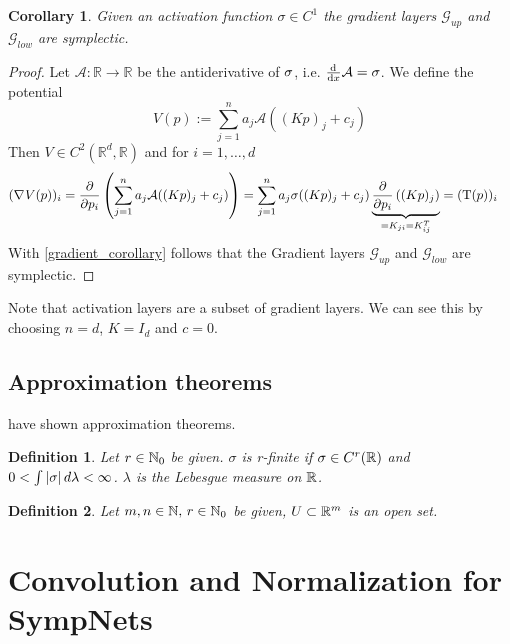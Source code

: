 \documentclass[twoside,a4paper]{article}
\newtheorem{definition}{Definition}
\newtheorem{corollary}{Corollary}
\begin{document}
\begin{corollary}
	Given an activation function $\sigma \in C^1$ the gradient layers $\mathcal{G}_{up}$
	and $\mathcal{G}_{low}$ are symplectic.
\end{corollary}
\begin{proof}
	Let $\mathcal{A}: \mathbb{R} \to \mathbb{R}$ be the antiderivative of $\sigma$, 
	i.e. $\frac{\mathrm{d}^{}}{\mathrm{d}x} \mathcal{A} = \sigma$. We define the potential
	\begin{equation*}
		V(p) := \sum_{j=1}^n a_j \mathcal{A}((Kp)_j + c_j)
	\end{equation*}
	Then $V \in C^2(\mathbb{R}^d, \mathbb{R})$ and for $i=1, \dots, d$
	\begin{align*}
		(\nabla_{}{V(p)})_i &= \frac{\partial }{\partial p_i} \left( \sum_{j=1}^n a_j \mathcal{A}((Kp)_j + c_j) \right)
		= \sum_{j=1}^n a_j \sigma((Kp)_j + c_j) 
		\underbrace{\frac{\partial }{\partial p_i} \left( (Kp)_j \right)}_{=K_{ji} = K^T_{ij}}
		= (\mathrm{T}(p))_i
	\end{align*}
	With \cref{gradient_corollary} follows that the Gradient layers
	$\mathcal{G}_{up}$ and $\mathcal{G}_{low}$ are symplectic.
\end{proof}

Note that activation layers are a subset of gradient layers. We can see this by choosing
$n=d$, $K=I_d$ and $c=0$.


\subsection{Approximation theorems}


\citeauthor{Jin2020} have shown \citeauthor{Jin2020} approximation theorems.

\begin{definition}
	Let $r \in \mathbb{N}_0$ be given. $\sigma$ is r-finite if $\sigma \in C^r(\mathbb{R})$
	and $0 < \int \left|{\sigma}\right| d\lambda < \infty$. $\lambda$ is the Lebesgue measure on $\mathbb{R}$.
\end{definition}

\begin{definition}
	Let $m,n \in \mathbb{N}, \, r \in \mathbb{N}_0$ be given, $U \subset \mathbb{R}^m$ is an open set.
\end{definition}

\section{Convolution and Normalization for SympNets}
\end{document}
